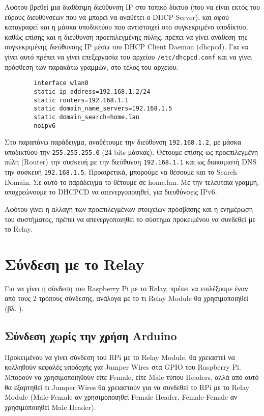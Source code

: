 		Αφότου βρεθεί μια διαθέσιμη διεύθυνση IP στο τοπικό δίκτυο (που να είναι εκτός του εύρους διευθύνσεων που να μπορεί να αναθέτει ο DHCP Server), και αφού καταγραφεί και η μάσκα υποδικτύου που αντιστοιχεί στο συγκεκριμένο υποδίκτυο, καθώς επίσης και η διεύθυνση προεπιλεγμένης πύλης, πρέπει να γίνει ανάθεση της συγκεκριμένης διεύθυνσης IP μέσω του DHCP Client Daemon (dhcpcd). Για να γίνει αυτό πρέπει να γίνει επεξεργασία του αρχείου \verb|/etc/dhcpcd.conf| και να γίνει πρόσθεση των παρακάτω γραμμών, στο τέλος του αρχείου:

		\begin{lstlisting}
		interface wlan0
		static ip_address=192.168.1.2/24
		static routers=192.168.1.1
		static domain_name_servers=192.168.1.5
		static domain_search=home.lan
		noipv6\end{lstlisting}

		Στο παραπάνω παράδειγμα, αναθέτουμε την διεύθυνση \verb|192.168.1.2|, με μάσκα υποδικτύου την \verb|255.255.255.0| (24 bits μάσκας). Θέτουμε επίσης ως προεπιλεγμένη πύλη (Router) την συσκευή με την διεύθυνση \verb|192.168.1.1| και ως διακομιστή DNS την συσκευή \verb|192.168.1.5|. Προαιρετικά, μπορούμε να θέσουμε και το Search Domain. Σε αυτό το παράδειγμα το θέτουμε σε home.lan. Με την τελευταία γραμμή, υποχρεώνουμε το DHCPCD να απενεργοποιηθεί, για διευθύνσεις IPv6.

	Αφότου γίνει η αλλαγή των προεπιλεγμένων στοιχείων πρόσβασης και η ενημέρωση του συστήματος, πρέπει να απενεργοποιηθεί το σύστημα προκειμένου να συνδεθεί με το Relay. 

\section{Σύνδεση με το Relay}
	Για να γίνει η σύνδεση του Raspberry Pi με το Relay, πρέπει να επιλέξουμε έναν από τους 2 τρόπους σύνδεσης, ανάλογα με το τι Relay Module θα χρησιμοποιηθεί (βλ. ).

	\subsection{Σύνδεση χωρίς την χρήση Arduino}
		Προκειμένου να γίνει σύνδεση του RPi με το Relay Module, θα χρειαστεί να κολληθούν κεφαλές υποδοχής για Jumper Wires στα GPIO του Raspberry Pi. Μπορούν να χρησιμοποιηθούν είτε Female, είτε Male τύπου Headers, αλλά από αυτό θα εξαρτηθεί τι Jumper Wires θα χρειαστούν για να συνδεθεί το RPi με το Relay Module (Male-Female αν χρησιμοποιηθεί Female Header, Female-Female αν χρησιμοποιηθεί Male Header).

